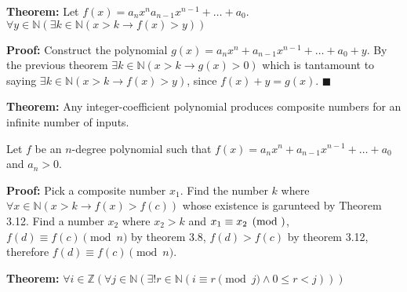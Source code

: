 \item \textbf{Theorem:} Let \(f(x) = a_n x^n a_{n-1} x^{n-1} + \dots + a_0\). \(\forall y \in \mathbb N (\exists k \in \mathbb N (x > k \rightarrow f(x) > y))\)

\textbf{Proof:} Construct the polynomial \(g(x) = a_n x^n + a_{n-1} x^{n-1} + \dots + a_0 + y\). By the previous theorem \(\exists k \in \mathbb N (x > k \rightarrow g(x) > 0)\) which is tantamount to saying \(\exists k \in \mathbb N (x > k \rightarrow f(x) > y)\), since \(f(x) + y = g(x)\). {\tiny \(\blacksquare\)}

\item \textbf{Theorem:} Any integer-coefficient polynomial produces composite numbers for an infinite number of inputs.

Let \(f\) be an \(n\)-degree polynomial such that \(f(x) = a_n x^n + a_{n-1} x^{n-1} + \dots + a_0 \) and \(a_n > 0\).

\textbf{Proof:} Pick a composite number \(x_1\). Find the number \(k\) where \(\forall x \in \mathbb N (x > k \rightarrow f(x) > f(c))\) whose existence is garunteed by Theorem 3.12. Find a number \(x_2\) where \(x_2 > k\) and \(x_1 \equiv x_2 \pmod \), \(f(d) \equiv f(c) \pmod n\) by theorem 3.8, \(f(d) > f(c)\) by theorem 3.12, therefore \(f(d) \equiv f(c) \pmod n\).

\item \textbf{Theorem:} \(\forall i \in \mathbb Z (\forall j \in \mathbb N (\exists ! r \in \mathbb N (i \equiv r \pmod j \wedge 0 \leq r < j)))\)

